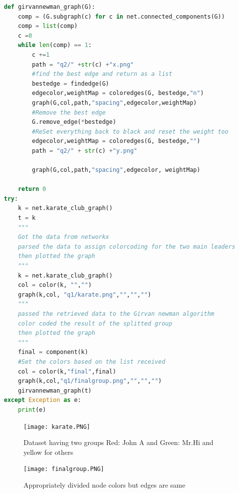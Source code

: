 \documentclass[12pt]{article}
\begin{document}
\begin{lstlisting}[language=Python, caption=mygraph.py , label=lst:copy]
def girvannewman_graph(G):
    comp = (G.subgraph(c) for c in net.connected_components(G))
    comp = list(comp)
    c =0
    while len(comp) == 1:
        c +=1
        path = "q2/" +str(c) +"x.png"
        #find the best edge and return as a list
        bestedge = findedge(G)
        edgecolor,weightMap = coloredges(G, bestedge,"n")
        graph(G,col,path,"spacing",edgecolor,weightMap)
        #Remove the best edge
        G.remove_edge(*bestedge)
        #ReSet everything back to black and reset the weight too
        edgecolor,weightMap = coloredges(G, bestedge,"")
        path = "q2/" + str(c) +"y.png"
        
        graph(G,col,path,"spacing",edgecolor, weightMap)
        
    return 0
try:
    k = net.karate_club_graph()
    t = k
    """
    Got the data from networkx
    parsed the data to assign colorcoding for the two main leaders
    then plotted the graph
    """
    k = net.karate_club_graph()
    col = color(k, "","")
    graph(k,col, "q1/karate.png","","","")
    """
    passed the retrieved data to the Girvan newman algorithm
    color coded the result of the splitted group
    then plotted the graph
    """
    final = component(k)
    #Set the colors based on the list received
    col = color(k,"final",final)
    graph(k,col,"q1/finalgroup.png","","","")
    girvannewman_graph(t)
except Exception as e:
    print(e)
\end{lstlisting}



\begin{figure}[h]
    \centering
    \texttt{[image: karate.PNG]}
    \caption{Dataset having two groups Red: John A and Green: Mr.Hi and yellow for others }
    \label{fig:web-growth}
\end{figure}

\begin{figure}[h]
    \centering
    \texttt{[image: finalgroup.PNG]}
    \caption{Appropriately divided node colors but edges are same}
    \label{fig:web-growth}
\end{figure}

\clearpage
\end{document}
